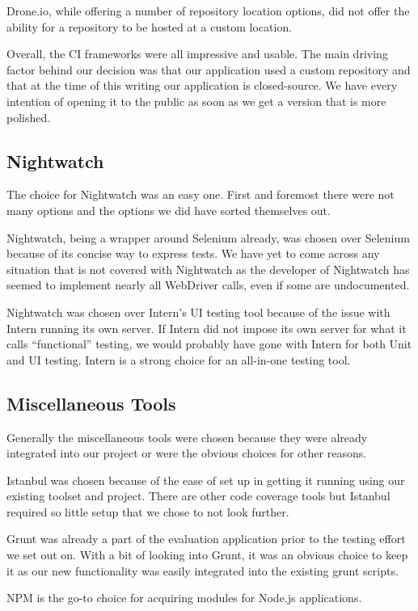 \documentclass[12pt]{ucthesis}
\begin{document}
Drone.io, while offering a number of repository location options, did not offer the ability for a repository to be hosted at a custom location.

Overall, the CI frameworks were all impressive and usable. The main driving factor behind our decision was that our application used a custom repository and that at the time of this writing our application is closed-source. We have every intention of opening it to the public as soon as we get a version that is more polished.

\subsection{Nightwatch}
The choice for Nightwatch was an easy one. First and foremost there were not many options and the options we did have sorted themselves out.

Nightwatch, being a wrapper around Selenium already, was chosen over Selenium because of its concise way to express tests. We have yet to come across any situation that is not covered with Nightwatch as the developer of Nightwatch has seemed to implement nearly all WebDriver calls, even if some are undocumented.

Nightwatch was chosen over Intern's UI testing tool because of the issue with Intern running its own server. If Intern did not impose its own server for what it calls ``functional'' testing, we would probably have gone with Intern for both Unit and UI testing. Intern is a strong choice for an all-in-one testing tool.

\subsection{Miscellaneous Tools}
Generally the miscellaneous tools were chosen because they were already integrated into our project or were the obvious choices for other reasons.

Istanbul was chosen because of the ease of set up in getting it running using our existing toolset and project. There are other code coverage tools but Istanbul required so little setup that we chose to not look further.

Grunt was already a part of the evaluation application prior to the testing effort we set out on. With a bit of looking into Grunt, it was an obvious choice to keep it as our new functionality was easily integrated into the existing grunt scripts.

NPM is the go-to choice for acquiring modules for Node.js applications.
\end{document}
